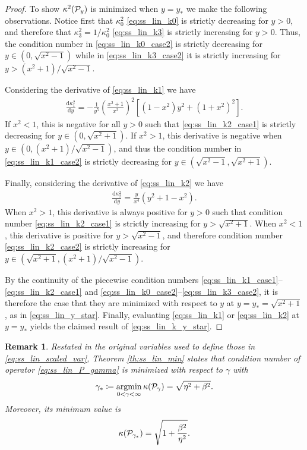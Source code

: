 \documentclass[a4paper,10pt]{article}
\newtheorem{remark}{Remark}
\begin{document}
\begin{proof}
To show $\kappa^2({\cal P}_y)$ is minimized when $y = y_*$ we make the following observations. Notice first that $\kappa_0^2$ \eqref{eq:ss_lin_k0} is strictly decreasing for $y > 0$, and therefore that $\kappa_3^2 = 1/\kappa_0^2$ \eqref{eq:ss_lin_k3} is strictly increasing for $y > 0$. Thus, the condition number in \eqref{eq:ss_lin_k0_case2} is strictly decreasing for $y \in (0, \sqrt{x^2-1})$ while in \eqref{eq:ss_lin_k3_case2} it is strictly increasing for $y > (x^2+1)/\sqrt{x^2-1}$.

Considering the derivative of \eqref{eq:ss_lin_k1} we have
\begin{align*}
\frac{\textrm{d} \kappa_1^2}{\textrm{d} y} 
= 
- \frac{1}{y^5}\left( \frac{x^2+1}{x^2} \right)^2 
\left[
(1-x^2) y^2 + (1+x^2)^2
\right].
\end{align*}
If $x^2 < 1$, this is negative for all $y > 0$ such that \eqref{eq:ss_lin_k2_case1} is strictly decreasing for $y \in (0, \sqrt{x^2+1})$. If $x^2 > 1$, this derivative is negative when $y \in (0, (x^2+1)/\sqrt{x^2-1})$, and thus the condition number in \eqref{eq:ss_lin_k1_case2} is strictly decreasing for $y \in (\sqrt{x^2-1},\sqrt{x^2+1})$.

Finally, considering the derivative of \eqref{eq:ss_lin_k2} we have
\begin{align*}
\frac{\textrm{d} \kappa_2^2}{\textrm{d} y} = \frac{y}{x^4} (y^2 + 1 - x^2).
\end{align*}
When $x^2 > 1$, this derivative is always positive for $y > 0$ such that condition number \eqref{eq:ss_lin_k2_case1} is strictly increasing for $y > \sqrt{x^2+1}$. When $x^2<1$, this derivative is positive for $y > \sqrt{x^2-1}$, and therefore condition number \eqref{eq:ss_lin_k2_case2} is strictly increasing for $y \in (\sqrt{x^2 + 1}, (x^2+1)/\sqrt{x^2-1})$.

By the continuity of the piecewise condition numbers \eqref{eq:ss_lin_k1_case1}--\eqref{eq:ss_lin_k2_case1} and \eqref{eq:ss_lin_k0_case2}--\eqref{eq:ss_lin_k3_case2}, it is therefore the case that they are minimized with respect to $y$ at $y = y_* = \sqrt{x^2 + 1}$, as in \eqref{eq:ss_lin_y_star}. Finally, evaluating \eqref{eq:ss_lin_k1} or \eqref{eq:ss_lin_k2} at $y = y_*$ yields the claimed result of \eqref{eq:ss_lin_k_y_star}.
\end{proof}

\begin{remark}
Restated in the original variables used to define those in \eqref{eq:ss_lin_scaled_var}, Theorem \ref{th:ss_lin_min} states that condition number of operator \eqref{eq:ss_lin_P_gamma} is minimized with respect to $\gamma$ with
\begin{align}
\gamma_* \coloneqq \underset{0 < \gamma < \infty}{\rm argmin} \, \kappa({\cal P}_{\gamma}) = \sqrt{\eta^2 + \beta^2}.
\end{align}
Moreover, its minimum value is
\begin{align}
\kappa({\cal P}_{\gamma_*}) = \sqrt{1 + \frac{\beta^2}{\eta^2}}.
\end{align}
\end{remark}
\end{document}
